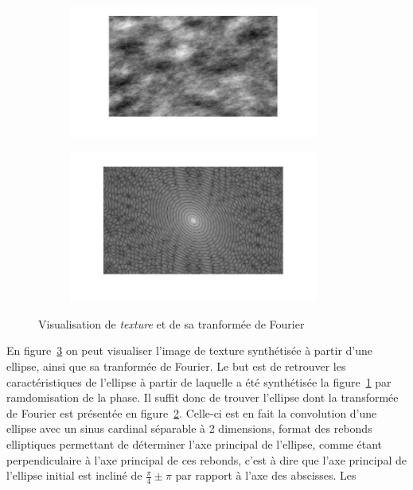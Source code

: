 \documentclass[12pt,a4paper,onecolumn]{article}
\begin{document}
\begin{figure}[H]
	\centering
	\begin{subfigure}[b]{\textwidth}
		\centering
		\includegraphics[width = 0.9\textwidth]{10_3_obj}
		\label{10_3_11}
	\end{subfigure}
	\begin{subfigure}[b]{\textwidth}
		\centering
		\includegraphics[width = 0.9\textwidth]{10_3_obj_fft}
		\label{10_3_obj_fft}
	\end{subfigure}
	\caption{Visualisation de \textit{texture} et de sa tranformée de Fourier}
	\label{10_3_obj}
\end{figure}

En figure~\ref{10_3_obj} on peut visualiser l'image de texture synthétisée à partir d'une ellipse, ainsi que sa tranformée de Fourier. Le but est de retrouver les caractéristiques de l'ellipse à partir de laquelle a été synthétisée la figure~\ref{10_3_11} par ramdomisation de la phase. Il suffit donc de trouver l'ellipse dont la transformée de Fourier est présentée en figure~\ref{10_3_obj_fft}. Celle-ci est en fait la convolution d'une ellipse avec un sinus cardinal séparable à 2 dimensions, format des rebonds elliptiques permettant de déterminer l'axe principal de l'ellipse, comme étant perpendiculaire à l'axe principal de ces rebonds, c'est à dire que l'axe principal de l'ellipse initial est incliné de \(\frac{\pi}{4} \pm \pi\) par rapport à l'axe des abscisses. Les
\end{document}
